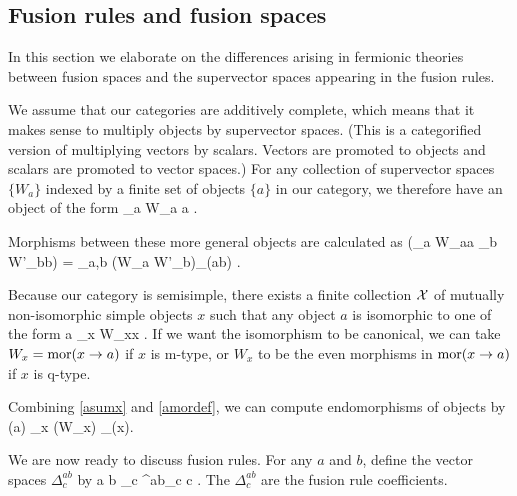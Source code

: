 \subsection{Fusion rules and fusion spaces} \label{fusion_rules_and_fusion_spaces}



In this section we elaborate on the differences arising in fermionic theories between fusion spaces and the supervector spaces appearing in the fusion rules. 

We assume that our categories are additively complete, which means that it makes sense to
multiply objects by supervector spaces. 
(This is a categorified version of multiplying vectors by scalars.
Vectors are promoted to objects and scalars are promoted to vector spaces.)
For any collection of supervector spaces $\{W_a\}$ indexed by 
a finite set of objects $\{a\}$ in our category, 
we therefore have an object of the form
\be 
	\bigoplus_a W_a \cdot a .
\ee

Morphisms between these more general objects are calculated as  
\be  \label{amordef}
	\mor(\bigoplus_a W_a\cdot a \to \bigoplus_b W'_b\cdot b) = \bigoplus_{a,b} \Hom(W_a \to W'_b)\otimes_\cc \mor(a\to b) .
\ee

Because our category is semisimple, there exists a finite collection $\mathcal{X}$ of mutually non-isomorphic simple objects $x$ such
that any object $a$ is isomorphic to one of the form
\be \label{asumx}
	a \cong \bigoplus_{x\in \mcx} W_x\cdot x .
\ee
If we want the isomorphism to be canonical, we can take $W_x = \text{mor}(x\to a)$ if $x$ is m-type, or $W_x$ to be the even morphisms in $\text{mor}(x\to a)$
if $x$ is q-type.

Combining \eqref{asumx} and \eqref{amordef}, we can compute endomorphisms of objects by
\be
	\End(a) \cong \bigoplus_{x\in \mcx} \End(W_x) \otimes_\cc \End(x).
\ee

We are now ready to discuss fusion rules. 
For any $a$ and $b$, define the vector spaces $\Delta^{ab}_c$ by
\be
	a \otimes b \cong \bigoplus_{c\in \mcx} \Delta^{ab}_c \cdot c .
\ee
The $\Delta^{ab}_c$ are the fusion rule coefficients. 

